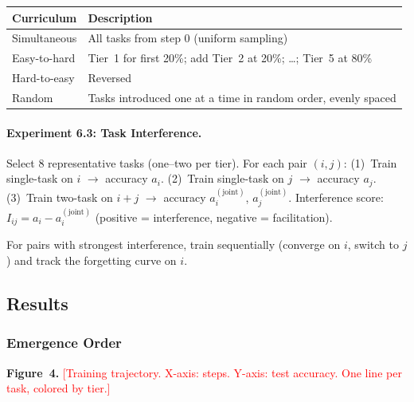 \documentclass[11pt]{article}
\newcommand{\placeholder}[1]{\textcolor{red}{[#1]}}
\begin{document}
\begin{table}[h]
\centering
\small
\begin{tabular}{ll}
\toprule
\textbf{Curriculum} & \textbf{Description} \\
\midrule
Simultaneous & All tasks from step 0 (uniform sampling) \\
Easy-to-hard & Tier~1 for first 20\%; add Tier~2 at 20\%; \ldots; Tier~5 at 80\% \\
Hard-to-easy & Reversed \\
Random & Tasks introduced one at a time in random order, evenly spaced \\
\bottomrule
\end{tabular}
\end{table}

\paragraph{Experiment 6.3: Task Interference.}
Select 8 representative tasks (one--two per tier). For each pair $(i, j)$:
(1)~Train single-task on $i$ $\to$ accuracy $a_i$.
(2)~Train single-task on $j$ $\to$ accuracy $a_j$.
(3)~Train two-task on $i + j$ $\to$ accuracy $a_i^{(\mathrm{joint})}$, $a_j^{(\mathrm{joint})}$.
Interference score: $I_{ij} = a_i - a_i^{(\mathrm{joint})}$ (positive = interference, negative = facilitation).

For pairs with strongest interference, train sequentially (converge on $i$, switch to $j$) and track the forgetting curve on $i$.


\subsection{Results}

\subsubsection{Emergence Order}

\textbf{Figure~4.} \placeholder{Training trajectory. X-axis: steps. Y-axis: test accuracy. One line per task, colored by tier.}
\end{document}
